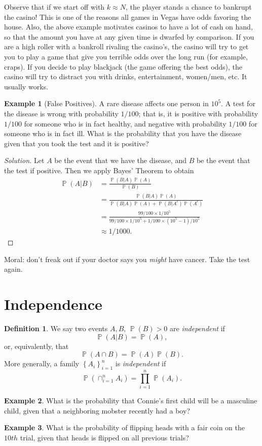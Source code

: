 \documentclass[12pt]{amsbook}
\DeclareMathOperator{\prob}{\mathbb{P}}
\theoremstyle{plain}
\theoremstyle{definition}
\newtheorem*{definition}{Definition}
\newtheorem*{example}{Example}
\theoremstyle{remark}
\numberwithin{equation}{section}  %
\begin{document}
Observe that if we start off with $k \approx N$, the player stands a chance to
bankrupt the casino! This is one of the reasons all games in Vegas have odds
favoring the house. Also, the above example motivates casinos to have a lot of
cash on hand, so that the amount you have at any given time is dwarfed by
comparison. If you are a high roller with a bankroll rivaling the casino's,
the casino will try to get you to play a game that give you terrible odds over
the long run (for example, craps). If you decide to play blackjack (the game
offering the best odds), the casino will try to distract you with drinks,
entertainment, women/men, etc. It usually works.
\begin{example}[False Positives]
	A rare disease affects one person in $10^5$. A test for the disease
	is wrong with probability $1/100$; that is, it is positive with probability
	$1/100$ for someone who is in fact healthy, and negative
	with probability $1/100$ for someone who is in fact ill. What is the 
	probability
	that you have the disease given that you took the test and it is positive?
\end{example}
\begin{proof}[Solution]
	Let $A$ be the event that we have the disease, and $B$ be the event
	that the test if positive. Then we apply
	Bayes' Theorem to obtain
	\begin{align*}
		\prob(A | B) & = \frac{\prob(B | A) \prob(A)}{\prob(B)}
		\\
		& = \frac{\prob(B | A) \prob(A)}{\prob(B|A) \prob(A) + \prob(B | A^c)
		\prob(A^c)}
		\\
		& = \frac{99/100 \times 1/10^5}{99/100 \times 1/10^5 + 1/100 \times 
			(10^5 -
		1)/10^5}
		\\
		& \approx 1/1000.
	\end{align*}
\end{proof}
Moral: don't freak out if your doctor says you \emph{might} have
cancer. Take the test again.
\section{Independence}
\begin{definition}
	We say two events $A, B$, $\prob(B) > 0$ are \emph{independent} if 
	\[\prob(A |
	B) = \prob(A),\] or, equivalently, that \[\prob(A \cap B) = \prob(A) 
	\prob(B).\] More generally,
	a family $ {\left\{ A_i \right\}}_{i = 1}^n $ is
	\emph{independent} if 
	\[ \prob(\cap_{i = 1}^n A_i) = \prod_{i = 1}^n \prob(A_i).\]
\end{definition}
\begin{example}
	What is the probability that Connie's first child will be a masculine child,
	given that a neighboring mobster recently had a boy?
\end{example}
\begin{example}
	What is the probability of flipping heads with a fair coin on the $10th$ 
	trial,
	given that heads is flipped on all previous trials?
\end{example}
\end{document}

